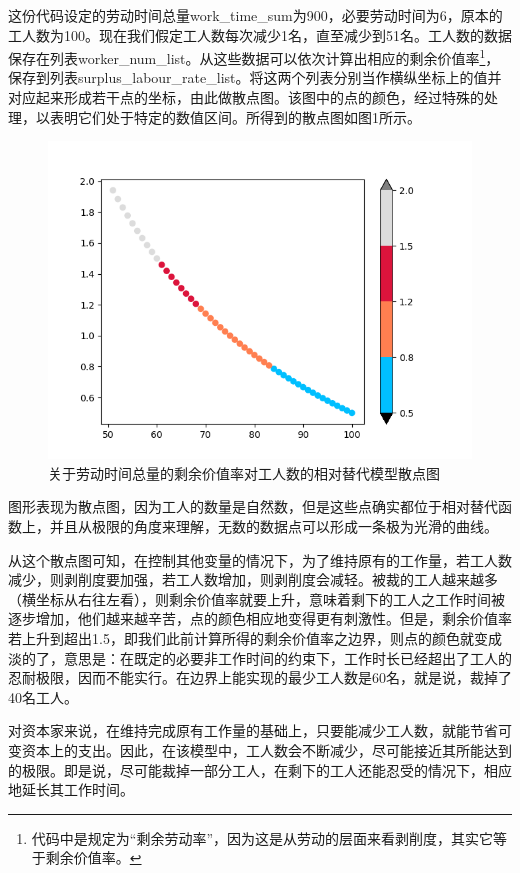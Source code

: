 \documentclass[a4paper,11pt]{ctexart}
\begin{document}
这份代码设定的劳动时间总量work\_time\_sum为900，必要劳动时间为6，原本的工人数为100。现在我们假定工人数每次减少1名，直至减少到51名。工人数的数据保存在列表worker\_num\_list。从这些数据可以依次计算出相应的剩余价值率\footnote{代码中是规定为“剩余劳动率”，因为这是从劳动的层面来看剥削度，其实它等于剩余价值率。}，保存到列表surplus\_labour\_rate\_list。将这两个列表分别当作横纵坐标上的值并对应起来形成若干点的坐标，由此做散点图。该图中的点的颜色，经过特殊的处理，以表明它们处于特定的数值区间。所得到的散点图如图1所示。

\begin{figure}[htb]
    \centering
    \includegraphics[width=\textwidth]{Figure_1.png}
    \caption{\label{1} 关于劳动时间总量的剩余价值率对工人数的相对替代模型散点图}
\end{figure}

图形表现为散点图，因为工人的数量是自然数，但是这些点确实都位于相对替代函数上，并且从极限的角度来理解，无数的数据点可以形成一条极为光滑的曲线。

从这个散点图可知，在控制其他变量的情况下，为了维持原有的工作量，若工人数减少，则剥削度要加强，若工人数增加，则剥削度会减轻。被裁的工人越来越多（横坐标从右往左看），则剩余价值率就要上升，意味着剩下的工人之工作时间被逐步增加，他们越来越辛苦，点的颜色相应地变得更有刺激性。但是，剩余价值率若上升到超出1.5，即我们此前计算所得的剩余价值率之边界，则点的颜色就变成淡的了，意思是：在既定的必要非工作时间的约束下，工作时长已经超出了工人的忍耐极限，因而不能实行。在边界上能实现的最少工人数是60名，就是说，裁掉了40名工人。

对资本家来说，在维持完成原有工作量的基础上，只要能减少工人数，就能节省可变资本上的支出。因此，在该模型中，工人数会不断减少，尽可能接近其所能达到的极限。即是说，尽可能裁掉一部分工人，在剩下的工人还能忍受的情况下，相应地延长其工作时间。
\end{document}
